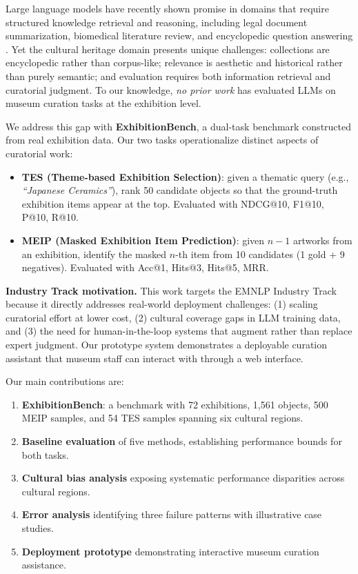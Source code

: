 \documentclass[11pt]{article}
\begin{document}
Large language models have recently shown promise in domains that require
structured knowledge retrieval and reasoning, including legal document
summarization, biomedical literature review, and encyclopedic question
answering \citep{zhao2023survey}.
Yet the cultural heritage domain presents unique challenges: collections are
encyclopedic rather than corpus-like; relevance is aesthetic and historical
rather than purely semantic; and evaluation requires both information retrieval
and curatorial judgment.
To our knowledge, \emph{no prior work} has evaluated LLMs on museum curation
tasks at the exhibition level.

We address this gap with \textbf{ExhibitionBench}, a dual-task benchmark
constructed from real exhibition data.
Our two tasks operationalize distinct aspects of curatorial work:
\begin{itemize}
  \item \textbf{TES (Theme-based Exhibition Selection)}: given a thematic query
    (e.g., \emph{``Japanese Ceramics''}), rank 50 candidate objects so that
    the ground-truth exhibition items appear at the top.
    Evaluated with NDCG@10, F1@10, P@10, R@10.
  \item \textbf{MEIP (Masked Exhibition Item Prediction)}: given $n{-}1$
    artworks from an exhibition, identify the masked $n$-th item from 10
    candidates (1 gold + 9 negatives).
    Evaluated with Acc@1, Hits@3, Hits@5, MRR.
\end{itemize}

\noindent\textbf{Industry Track motivation.}
This work targets the EMNLP Industry Track because it directly addresses
real-world deployment challenges: (1) scaling curatorial effort at lower cost,
(2) cultural coverage gaps in LLM training data, and (3) the need for
human-in-the-loop systems that augment rather than replace expert judgment.
Our prototype system demonstrates a deployable curation assistant that museum
staff can interact with through a web interface.

Our main contributions are:
\begin{enumerate}
  \item \textbf{ExhibitionBench}: a benchmark with 72 exhibitions, 1,561
    objects, 500 MEIP samples, and 54 TES samples spanning six cultural regions.
  \item \textbf{Baseline evaluation} of five methods, establishing performance
    bounds for both tasks.
  \item \textbf{Cultural bias analysis} exposing systematic performance
    disparities across cultural regions.
  \item \textbf{Error analysis} identifying three failure patterns with
    illustrative case studies.
  \item \textbf{Deployment prototype} demonstrating interactive museum
    curation assistance.
\end{enumerate}
\end{document}
